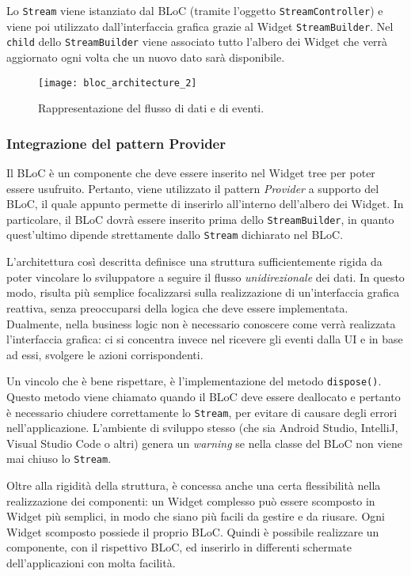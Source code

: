 Lo \verb|Stream| viene istanziato dal BLoC (tramite l'oggetto \verb|StreamController|) e viene poi utilizzato dall'interfaccia grafica grazie al Widget \verb|StreamBuilder|. Nel \verb|child| dello \verb|StreamBuilder| viene associato tutto l'albero dei Widget che verrà aggiornato ogni volta che un nuovo dato sarà disponibile.

\begin{figure}
	\begin{center}
		\texttt{[image: bloc\_architecture\_2]}
		\caption[BLoC - Flusso di dati e di eventi]{Rappresentazione del flusso di dati e di eventi.}
		\label{figura:bloc_architecture_2}
	\end{center}
\end{figure}

\subsubsection{Integrazione del pattern Provider}
Il BLoC è un componente che deve essere inserito nel Widget tree per poter essere usufruito. Pertanto, viene utilizzato il pattern \textit{Provider} a supporto del BLoC, il quale appunto permette di inserirlo all'interno dell'albero dei Widget. In particolare, il BLoC dovrà essere inserito prima dello \verb|StreamBuilder|, in quanto quest'ultimo dipende strettamente dallo \verb|Stream| dichiarato nel BLoC.

L'architettura così descritta definisce una struttura sufficientemente rigida da poter vincolare lo sviluppatore a seguire il flusso \textit{unidirezionale} dei dati. In questo modo, risulta più semplice focalizzarsi sulla realizzazione di un'interfaccia grafica reattiva, senza preoccuparsi della logica che deve essere implementata. Dualmente, nella business logic non è necessario conoscere come verrà realizzata l'interfaccia grafica: ci si concentra invece nel ricevere gli eventi dalla UI e in base ad essi, svolgere le azioni corrispondenti.

Un vincolo che è bene rispettare, è l'implementazione del metodo \verb|dispose()|. Questo metodo viene chiamato quando il BLoC deve essere deallocato e pertanto è necessario chiudere correttamente lo \verb|Stream|, per evitare di causare degli errori nell'applicazione. L'ambiente di sviluppo stesso (che sia Android Studio, IntelliJ, Visual Studio Code o altri) genera un \textit{warning} se nella classe del BLoC non viene mai chiuso lo \verb|Stream|.

Oltre alla rigidità della struttura, è concessa anche una certa flessibilità nella realizzazione dei componenti: un Widget complesso può essere scomposto in Widget più semplici, in modo che siano più facili da gestire e da riusare. Ogni Widget scomposto possiede il proprio BLoC. Quindi è possibile realizzare un componente, con il rispettivo BLoC, ed inserirlo in differenti schermate dell'applicazioni con molta facilità.

